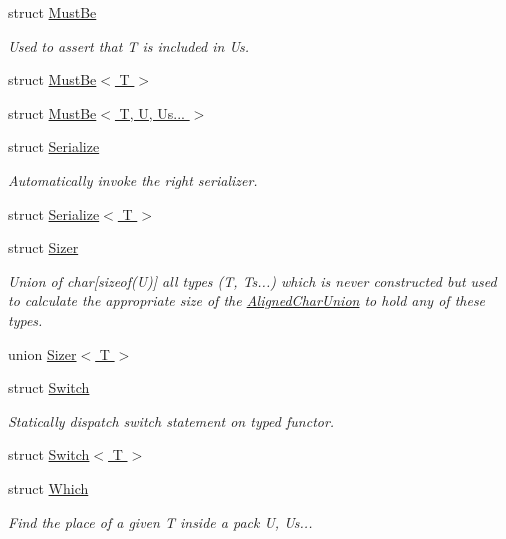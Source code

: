 \begin{DoxyCompactItemize}
\item 
struct \hyperlink{structvt_1_1util_1_1adt_1_1detail_1_1_must_be}{Must\+Be}
\begin{DoxyCompactList}\small\item\em Used to assert that {\ttfamily T} is included in {\ttfamily Us}. \end{DoxyCompactList}\item 
struct \hyperlink{structvt_1_1util_1_1adt_1_1detail_1_1_must_be_3_01_t_01_4}{Must\+Be$<$ T $>$}
\item 
struct \hyperlink{structvt_1_1util_1_1adt_1_1detail_1_1_must_be_3_01_t_00_01_u_00_01_us_8_8_8_01_4}{Must\+Be$<$ T, U, Us... $>$}
\item 
struct \hyperlink{structvt_1_1util_1_1adt_1_1detail_1_1_serialize}{Serialize}
\begin{DoxyCompactList}\small\item\em Automatically invoke the right serializer. \end{DoxyCompactList}\item 
struct \hyperlink{structvt_1_1util_1_1adt_1_1detail_1_1_serialize_3_01_t_01_4}{Serialize$<$ T $>$}
\item 
struct \hyperlink{unionvt_1_1util_1_1adt_1_1detail_1_1_sizer}{Sizer}
\begin{DoxyCompactList}\small\item\em Union of char\mbox{[}sizeof(\+U)\mbox{]} all types (T, Ts...) which is never constructed but used to calculate the appropriate size of the {\ttfamily \hyperlink{structvt_1_1util_1_1adt_1_1_aligned_char_union}{Aligned\+Char\+Union}} to hold any of these types. \end{DoxyCompactList}\item 
union \hyperlink{unionvt_1_1util_1_1adt_1_1detail_1_1_sizer_3_01_t_01_4}{Sizer$<$ T $>$}
\item 
struct \hyperlink{structvt_1_1util_1_1adt_1_1detail_1_1_switch}{Switch}
\begin{DoxyCompactList}\small\item\em Statically dispatch switch statement on typed functor. \end{DoxyCompactList}\item 
struct \hyperlink{structvt_1_1util_1_1adt_1_1detail_1_1_switch_3_01_t_01_4}{Switch$<$ T $>$}
\item 
struct \hyperlink{structvt_1_1util_1_1adt_1_1detail_1_1_which}{Which}
\begin{DoxyCompactList}\small\item\em Find the place of a given {\ttfamily T} inside a pack {\ttfamily U}, Us... \end{DoxyCompactList}\item 

\end{DoxyCompactItemize}
